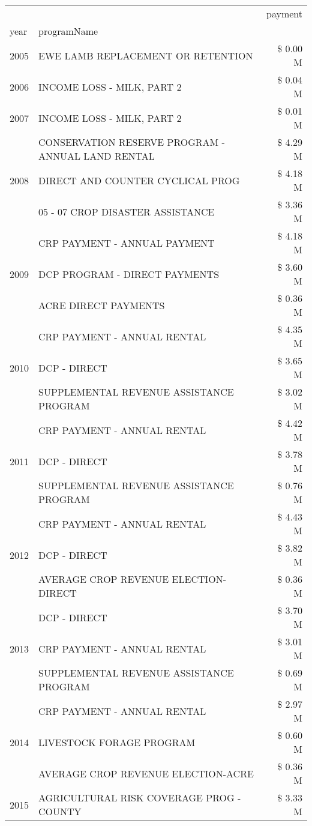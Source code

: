 \begin{tabular}{llr}
\toprule
 &  & payment \\
year & programName &  \\
\midrule
2005 & EWE LAMB REPLACEMENT OR RETENTION & \$ 0.00 M \\
\cline{1-3}
2006 & INCOME LOSS - MILK, PART 2 & \$ 0.04 M \\
\cline{1-3}
2007 & INCOME LOSS - MILK, PART 2 & \$ 0.01 M \\
\cline{1-3}
\multirow[t]{3}{*}{2008} & CONSERVATION RESERVE PROGRAM - ANNUAL LAND RENTAL & \$ 4.29 M \\
 & DIRECT AND COUNTER CYCLICAL PROG & \$ 4.18 M \\
 & 05 - 07 CROP DISASTER ASSISTANCE & \$ 3.36 M \\
\cline{1-3}
\multirow[t]{3}{*}{2009} & CRP PAYMENT - ANNUAL PAYMENT & \$ 4.18 M \\
 & DCP PROGRAM - DIRECT PAYMENTS & \$ 3.60 M \\
 & ACRE DIRECT PAYMENTS & \$ 0.36 M \\
\cline{1-3}
\multirow[t]{3}{*}{2010} & CRP PAYMENT - ANNUAL RENTAL & \$ 4.35 M \\
 & DCP - DIRECT & \$ 3.65 M \\
 & SUPPLEMENTAL REVENUE ASSISTANCE PROGRAM & \$ 3.02 M \\
\cline{1-3}
\multirow[t]{3}{*}{2011} & CRP PAYMENT - ANNUAL RENTAL & \$ 4.42 M \\
 & DCP - DIRECT & \$ 3.78 M \\
 & SUPPLEMENTAL REVENUE ASSISTANCE PROGRAM & \$ 0.76 M \\
\cline{1-3}
\multirow[t]{3}{*}{2012} & CRP PAYMENT - ANNUAL RENTAL & \$ 4.43 M \\
 & DCP - DIRECT & \$ 3.82 M \\
 & AVERAGE CROP REVENUE ELECTION-DIRECT & \$ 0.36 M \\
\cline{1-3}
\multirow[t]{3}{*}{2013} & DCP - DIRECT & \$ 3.70 M \\
 & CRP PAYMENT - ANNUAL RENTAL & \$ 3.01 M \\
 & SUPPLEMENTAL REVENUE ASSISTANCE PROGRAM & \$ 0.69 M \\
\cline{1-3}
\multirow[t]{3}{*}{2014} & CRP PAYMENT - ANNUAL RENTAL & \$ 2.97 M \\
 & LIVESTOCK FORAGE PROGRAM & \$ 0.60 M \\
 & AVERAGE CROP REVENUE ELECTION-ACRE & \$ 0.36 M \\
\cline{1-3}
\multirow[t]{3}{*}{2015} & AGRICULTURAL RISK COVERAGE PROG - COUNTY & \$ 3.33 M \\

\end{tabular}
